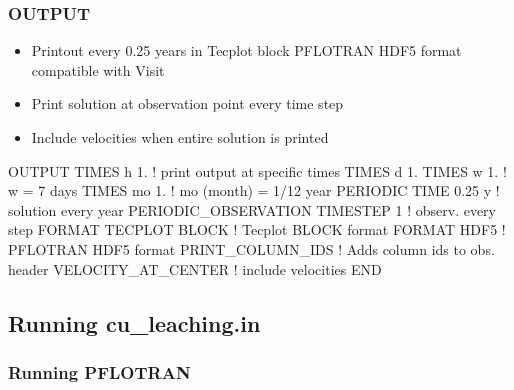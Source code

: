 \documentclass{beamer}
\newcommand\bluecomment[1]{{{\color{blue} #1}}}
\begin{document}
\begin{frame}[fragile]\frametitle{\bf OUTPUT}
\vspace{-1mm}
\begin{itemize}
\item Printout every 0.25 years in Tecplot block PFLOTRAN HDF5 format compatible with Visit
\item Print solution at observation point every time step
\item Include velocities when entire solution is printed
\end{itemize}
\vspace{-4mm}
\begin{semiverbatim}
OUTPUT
  TIMES h  1. \bluecomment{! print output at specific times}
  TIMES d  1.
  TIMES w  1.          \bluecomment{! w = 7 days}
  TIMES mo 1.          \bluecomment{! mo (month) = 1/12 year}
  PERIODIC TIME 0.25 y     \bluecomment{! solution every year}
  PERIODIC_OBSERVATION TIMESTEP 1  \bluecomment{! observ. every step}
  FORMAT TECPLOT BLOCK \bluecomment{! Tecplot BLOCK format}
  FORMAT HDF5          \bluecomment{! PFLOTRAN HDF5 format}
  PRINT_COLUMN_IDS     \bluecomment{! Adds column ids to obs. header}
  VELOCITY_AT_CENTER   \bluecomment{! include velocities}
END
\end{semiverbatim}

\end{frame}


\subsection{Running cu_leaching.in}

\begin{frame}[fragile]\frametitle{Running PFLOTRAN}


\end{frame}

\end{document}
